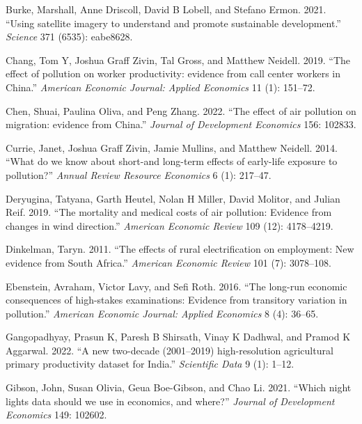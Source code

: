 \documentclass[
]{article}
\newlength{\cslhangindent}
\newlength{\cslentryspacingunit} %
\newenvironment{CSLReferences}[2] %
 {%
  \setlength{\parindent}{0pt}
  \ifodd #1
  \let\oldpar\par
  \def\par{\hangindent=\cslhangindent\oldpar}
  \fi
  \setlength{\parskip}{#2\cslentryspacingunit}
 }%
 {}
\begin{document}
\begin{CSLReferences}{1}{0}
\leavevmode{}%
Burke, Marshall, Anne Driscoll, David B Lobell, and Stefano Ermon. 2021. {``{Using satellite imagery to understand and promote sustainable development}.''} \emph{Science} 371 (6535): eabe8628.

\leavevmode{}%
Chang, Tom Y, Joshua Graff Zivin, Tal Gross, and Matthew Neidell. 2019. {``{The effect of pollution on worker productivity: evidence from call center workers in China}.''} \emph{{American Economic Journal: Applied Economics}} 11 (1): 151--72.

\leavevmode{}%
Chen, Shuai, Paulina Oliva, and Peng Zhang. 2022. {``{The effect of air pollution on migration: evidence from China}.''} \emph{{Journal of Development Economics}} 156: 102833.

\leavevmode{}%
Currie, Janet, Joshua Graff Zivin, Jamie Mullins, and Matthew Neidell. 2014. {``{What do we know about short-and long-term effects of early-life exposure to pollution?}''} \emph{{Annual Review Resource Economics}} 6 (1): 217--47.

\leavevmode{}%
Deryugina, Tatyana, Garth Heutel, Nolan H Miller, David Molitor, and Julian Reif. 2019. {``{The mortality and medical costs of air pollution: Evidence from changes in wind direction}.''} \emph{{American Economic Review}} 109 (12): 4178--4219.

\leavevmode{}%
Dinkelman, Taryn. 2011. {``{The effects of rural electrification on employment: New evidence from South Africa}.''} \emph{{American Economic Review}} 101 (7): 3078--108.

\leavevmode{}%
Ebenstein, Avraham, Victor Lavy, and Sefi Roth. 2016. {``{The long-run economic consequences of high-stakes examinations: Evidence from transitory variation in pollution}.''} \emph{{American Economic Journal: Applied Economics}} 8 (4): 36--65.

\leavevmode{}%
Gangopadhyay, Prasun K, Paresh B Shirsath, Vinay K Dadhwal, and Pramod K Aggarwal. 2022. {``{A new two-decade (2001--2019) high-resolution agricultural primary productivity dataset for India}.''} \emph{{Scientific Data}} 9 (1): 1--12.

\leavevmode{}%
Gibson, John, Susan Olivia, Geua Boe-Gibson, and Chao Li. 2021. {``{Which night lights data should we use in economics, and where?}''} \emph{{Journal of Development Economics}} 149: 102602.


\end{CSLReferences}
\end{document}
